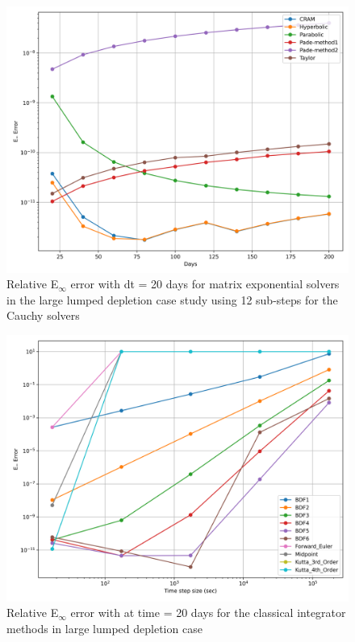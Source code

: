 \begin{figure}[p]
    \centering
    \includegraphics[width=5in]{images/chapter-5/caseStudies/largeLumpedDepletion/msrlargeLumpDepletionEinfErrorerrorSteps12.png}
    \caption{Relative E$_{\infty}$ error with dt = 20 days for matrix exponential solvers in the large lumped depletion case study using 12 sub-steps for the Cauchy solvers}
    \label{fig:large_lumped_depletion_Einf_steps12}
\end{figure}

\clearpage

\begin{figure}[p]
    \centering
    \includegraphics[width=5in]{images/chapter-5/caseStudies/largeLumpedDepletion/msrLargeLumpedDepletionEinfErrorerrorIntegrators.png}
    \caption{Relative E$_{\infty}$ error with at time = 20 days for the classical integrator methods in large lumped depletion case}
    \label{fig:large_lumped_depletion_Einf_integrators}
\end{figure}

